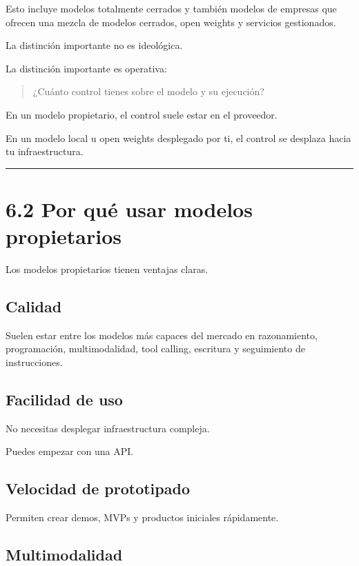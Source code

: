 Esto incluye modelos totalmente cerrados y también modelos de empresas
que ofrecen una mezcla de modelos cerrados, open weights y servicios
gestionados.

La distinción importante no es ideológica.

La distinción importante es operativa:

\begin{quote}
¿Cuánto control tienes sobre el modelo y su ejecución?
\end{quote}

En un modelo propietario, el control suele estar en el proveedor.

En un modelo local u open weights desplegado por ti, el control se
desplaza hacia tu infraestructura.

\begin{center}\rule{0.5\linewidth}{0.5pt}\end{center}

\section{6.2 Por qué usar modelos
propietarios}\label{por-quuxe9-usar-modelos-propietarios}

Los modelos propietarios tienen ventajas claras.

\subsection{Calidad}\label{calidad}

Suelen estar entre los modelos más capaces del mercado en razonamiento,
programación, multimodalidad, tool calling, escritura y seguimiento de
instrucciones.

\subsection{Facilidad de uso}\label{facilidad-de-uso}

No necesitas desplegar infraestructura compleja.

Puedes empezar con una API.

\subsection{Velocidad de prototipado}\label{velocidad-de-prototipado}

Permiten crear demos, MVPs y productos iniciales rápidamente.

\subsection{Multimodalidad}\label{multimodalidad-2}

